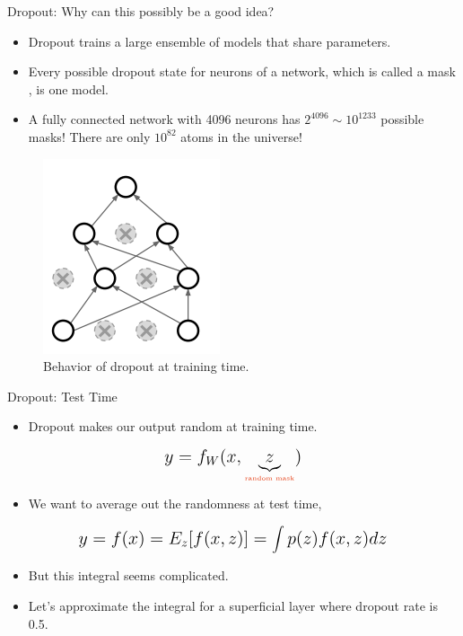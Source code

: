 \documentclass[compress,oilve,t]{beamer}
\newcommand{\tc}[2]{
	\textcolor{#1}{\hspace{-2pt}#2\hspace{-2pt}}
}
\begin{document}
\begin{frame}{Dropout: Why can this possibly be a good idea?}
	\begin{itemize}
		\item Dropout trains a \tc{keywords}{large ensemble of models} that share parameters.
		\medskip
		\item Every possible dropout state for neurons of a network, which is called a \tc{keywords}{mask}, is one model.
		\item A fully connected network with 4096 neurons has $2^{4096} \sim 10^{1233}$ possible masks! There are only $10^{82}$ atoms in the universe!
	\end{itemize}
	\begin{figure}[H]
		\centering
		\includegraphics[height=0.4\textheight]{Figs/section_4/dropout_why2.png}
		\caption{Behavior of dropout at training time. \cite{cs231n-2018-lecture7}}
	\end{figure}
\end{frame}
\begin{frame}{Dropout: Test Time}
	\begin{itemize}
		\item Dropout makes our output random at training time.
		\medskip
	\end{itemize}
	\begin{equation*}
		\mathlarger{\mathlarger{
				y = f_W(x, \underbrace{z}_{\text{\tiny{\tc{keywords}{random mask}}}})
		}}
	\end{equation*}
	\begin{itemize}
		\item We want to \tc{keywords}{average out} the randomness at test time,
		\medskip
	\end{itemize}
	\begin{equation*}
		\mathlarger{\mathlarger{
				y = f(x) = E_z[f(x, z)] = \int p(z)f(x, z) dz
		}}
	\end{equation*}
	\begin{itemize}
		\item But this integral seems complicated.
		\medskip
		\item Let's approximate the integral for a superficial layer where dropout rate is 0.5.
	\end{itemize}
\end{frame}
\end{document}
